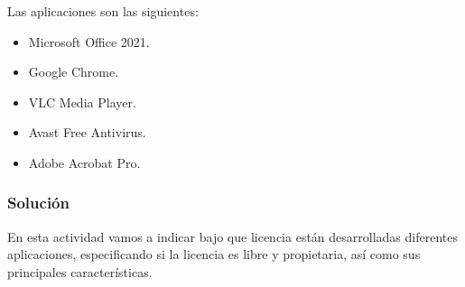 Las aplicaciones son las siguientes:

\begin{itemize}
    \item Microsoft Office 2021.
    \item Google Chrome.
    \item VLC Media Player.
    \item Avast Free Antivirus.
    \item Adobe Acrobat Pro.
\end{itemize}

\subsubsection{Solución}
En esta actividad vamos a indicar bajo que licencia están desarrolladas diferentes aplicaciones, especificando si la licencia es libre y propietaria, así como sus principales características.

